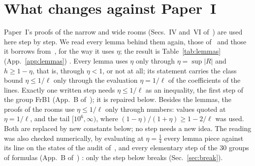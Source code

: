 \section{What changes against Paper~I}
\label{sec:changes}

Paper~I's proofs of the narrow and wide rooms (Secs.~IV and~VI of~\cite{I}) are used here step by step.
We read every lemma behind them again, those of~\cite{I} and those it borrows from~\cite{F,H}, for the way it uses $\eta$; the result is Table~\ref{tab:lemmas} (App.~\ref{app:lemmas}) \proofst.
Every lemma uses $\eta$ only through $\eta=\sup|R|$ and $h\ge1-\eta$, that is, through $\eta<1$, or not at all; its statement carries the class bound $\eta\le1/\ell$ only through the evaluation $\eta=1/\ell$ of the coefficients of the lines.
Exactly one written step needs $\eta\le1/\ell$ as an inequality, the first step of the group FrB1 (App.~B of~\cite{I}); it is repaired below.
Besides the lemmas, the proofs of the rooms use $\eta\le1/\ell$ only through numbers: values quoted at $\eta=1/\ell$, and the tail $[10^6,\infty)$, where $(1-\eta)/(1+\eta)\ge1-2/\ell$ was used.
Both are replaced by new constants below; no step needs a new idea.
The reading was also checked numerically, by evaluating at $\eta=\tfrac14$ every lemma piece against its line on the states of the audit of~\cite{I}, and every elementary step of the 30 groups of formulas (App.~B of~\cite{I}) \numst: only the step below breaks (Sec.~\ref{sec:break}).

